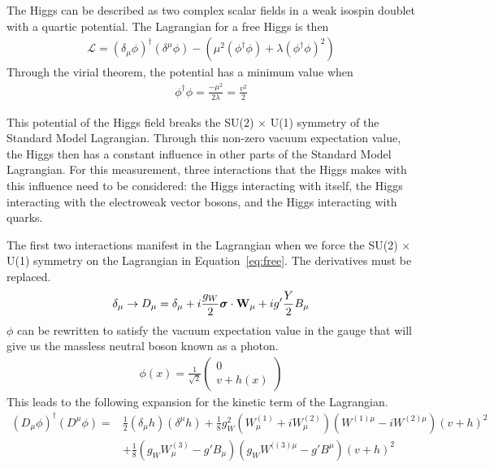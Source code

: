 The Higgs can be described as two complex scalar fields in a weak isospin doublet
with a quartic potential.
The Lagrangian for a free Higgs is then
\begin{gather}
  \mathcal{L} = (\delta_\mu \phi)^\dagger (\delta^\mu \phi) - (\mu^2(\phi^\dagger\phi) + \lambda(\phi^\dagger\phi)^2) \label{eq:free}
\end{gather}
Through the virial theorem, the potential has a minimum value when
\begin{gather}
  \phi^\dagger\phi = \frac{-\mu^2}{2\lambda} = \frac{v^2}{2} \label{eq:vacuum}
\end{gather}

This potential of the Higgs field breaks the SU(2) $\times$ U(1)
symmetry of the Standard Model Lagrangian.
Through this non-zero vacuum expectation value, the Higgs then has a constant influence
in other parts of the Standard Model Lagrangian.
For this measurement, three interactions that the Higgs makes
with this influence need to be considered:
the Higgs interacting with itself,
the Higgs interacting with the electroweak vector bosons,
and the Higgs interacting with quarks.

The first two interactions manifest in the Lagrangian when
we force the SU(2) $\times$ U(1) symmetry on the Lagrangian in Equation~\ref{eq:free}.
The derivatives must be replaced.
\begin{gather}
  \delta_\mu \rightarrow D_\mu = \delta_\mu + i\frac{g_W}{2} {\boldsymbol \sigma} \cdot {\bf W_\mu} + ig'\frac{Y}{2}B_\mu
\end{gather}
$\phi$ can be rewritten to satisfy the vacuum expectation value in the gauge that will give us the massless neutral boson known as a photon.
\begin{gather}
  \phi(x) = \frac{1}{\sqrt{2}}
  \left(
  \begin{matrix}
    0 \\
    v + h(x)
  \end{matrix}
  \right)
\end{gather}
This leads to the following expansion for the kinetic term of the Lagrangian.
\begin{align}
  (D_\mu \phi)^\dagger(D^\mu \phi) = & \frac12 (\delta_\mu h)(\delta^\mu h)
  + \frac18 g_W^2 (W^{(1)}_\mu + iW^{(2)}_\mu)(W^{(1)\mu} - iW^{(2)\mu})(v + h)^2 \nonumber \\
  & + \frac18 (g_W W^{(3)}_\mu - g'B_\mu)(g_W W^{((3)\mu} - g' B^\mu)(v + h)^2
\end{align}

